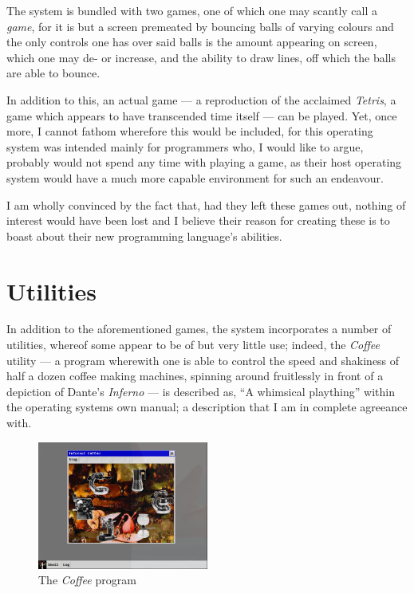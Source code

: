 \documentclass[a5paper,twoside,12pt]{report}
\begin{document}
  The system is bundled with two games, one of which one may scantly call a \textit{game}, for it is but a screen premeated by bouncing balls of varying colours and the only controls one has over said balls is the amount appearing on screen, which one may de- or increase, and the ability to draw lines, off which the balls are able to bounce.


  In addition to this, an actual game — a reproduction of the acclaimed \textit{Tetris}, a game which appears to have transcended time itself — can be played. Yet, once more, I cannot fathom wherefore this would be included, for this operating system was intended mainly for programmers who, I would like to argue, probably would not spend any time with playing a game, as their host operating system would have a much more capable environment for such an endeavour. 

  I am wholly convinced by the fact that, had they left these games out, nothing of interest would have been lost and I believe their reason for creating these is to boast about their new programming language's abilities.

  \section*{Utilities}

  In addition to the aforementioned games, the system incorporates a number of utilities, whereof some appear to be of but very little use; indeed, the \textit{Coffee} utility — a program wherewith one is able to control the speed and shakiness of half a dozen coffee making machines, spinning around fruitlessly in front of a depiction of Dante's \textit{Inferno} — is described as, ``A whimsical plaything'' within the operating systems own manual; a description that I am in complete agreeance with.

  \begin{figure}
    \centering
    \includegraphics[width=0.5\textwidth]{imgs/coffee.png}
    \caption{The \textit{Coffee} program}
  \end{figure}
\end{document}
